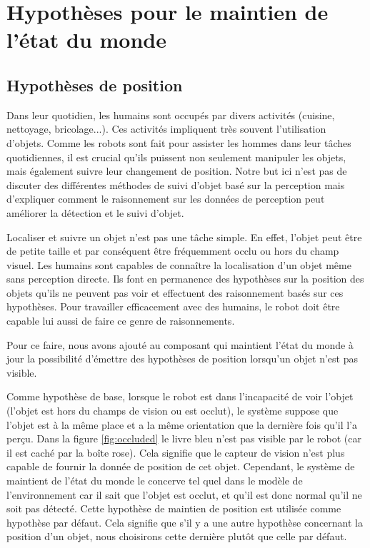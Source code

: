 \documentclass[a4paper,11pt,twoside]{StyleThese}
\begin{document}
\section{Hypothèses pour le maintien de l'état du monde}
\label{sec:hypo}
\subsection{Hypothèses de position}


Dans leur quotidien, les humains sont occupés par divers activités (cuisine, nettoyage, bricolage...). Ces activités impliquent très souvent l'utilisation d'objets. Comme les robots sont fait pour assister les hommes dans leur tâches quotidiennes, il est crucial qu'ils puissent non seulement manipuler les objets, mais également suivre leur changement de position. Notre but ici n'est pas de discuter des différentes méthodes de suivi d'objet basé sur la perception mais d'expliquer comment le raisonnement sur les données de perception peut améliorer la détection et le suivi d'objet.

Localiser et suivre un objet n'est pas une tâche simple. En effet, l'objet peut être de petite taille et par conséquent être fréquemment occlu ou hors du champ visuel.
Les humains sont capables de connaître la localisation d'un objet même sans perception directe. Ils font en permanence des hypothèses sur la position des objets qu'ils ne peuvent pas voir et effectuent des raisonnement basés sur ces hypothèses. Pour travailler efficacement avec des humains, le robot doit être capable lui aussi de faire ce genre de raisonnements.

Pour ce faire, nous avons ajouté au composant qui maintient l'état du monde à jour la possibilité d'émettre des hypothèses de position lorsqu'un objet n'est pas visible.

Comme hypothèse de base, lorsque le robot est dans l'incapacité de voir l'objet (l'objet est hors du champs de vision ou est occlut), le système suppose que l'objet est à la même place et a la même orientation que la dernière fois qu'il l'a perçu. Dans la figure \ref{fig:occluded} 
le livre bleu n'est pas visible par le robot (car il est caché par la boîte rose). Cela signifie que le capteur de vision n'est plus capable de fournir la donnée de position de cet objet. Cependant, le système de maintient de l'état du monde le concerve tel quel dans le modèle de l'environnement car il sait que l'objet est occlut, et qu'il est donc normal qu'il ne soit pas détecté. Cette hypothèse de maintien de position est utilisée comme hypothèse par défaut. Cela signifie que s'il y a une autre hypothèse concernant la position d'un objet, nous choisirons cette dernière plutôt que celle par défaut.
\end{document}
